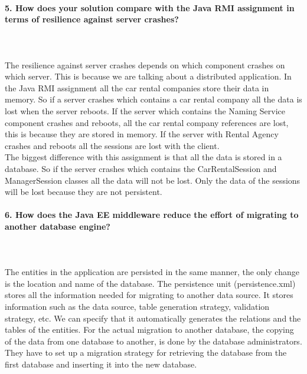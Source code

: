 \documentclass{ds-report}
\begin{document}
	\paragraph{5. How does your solution compare with the Java RMI assignment in terms of resilience against server crashes?} \mbox{}\\\\
The resilience against server crashes depends on which component crashes on which server. This is because we are talking about a distributed application. In the Java RMI assignment all the car rental companies store their data in memory. So if a server crashes which contains a car rental company all the data is lost when the server reboots. If the server which contains the Naming Service component crashes and reboots, all the car rental company references are lost, this is because they are stored in memory. If the server with Rental Agency crashes and reboots all the sessions are lost with the client.\\
The biggest difference with this assignment is that all the data is stored in a database. So if the server crashes which contains the CarRentalSession and ManagerSession classes all the data will not be lost. Only the data of the sessions will be lost because they are not persistent. 


		\paragraph{6. How does the Java EE middleware reduce the effort of migrating to another database engine?} \mbox{}\\\\
The entities in the application are persisted in the same manner, the only change is the location and name of the database. The persistence unit (persistence.xml) stores all the information needed for migrating to another data source. It stores information such as the data source, table generation strategy, validation strategy, etc. We can specify that it automatically  generates the relations and the tables of the entities.  
For the actual migration to another database, the copying of the data from one database to another, is done by the database administrators. They have to set up a migration strategy for retrieving the database from the first database and inserting it into the new database. 

 
\end{document}
